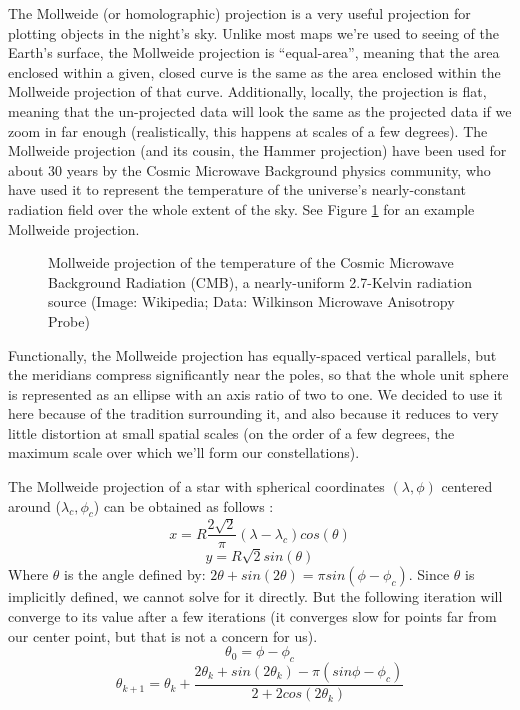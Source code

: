\documentclass[paper=a4, fontsize=11pt]{scrartcl} %
\begin{document}
The Mollweide (or homolographic) projection is a very useful projection for plotting objects in the night’s sky. Unlike most maps we’re used to seeing of the Earth’s surface, the Mollweide projection is ``equal-area”, meaning that the area enclosed within a given, closed curve is the same as the area enclosed within the Mollweide projection of that curve. Additionally, locally, the projection is flat, meaning that the un-projected data will look the same as the projected data if we zoom in far enough (realistically, this happens at scales of a few degrees). The Mollweide projection (and its cousin, the Hammer projection) have been used for about 30 years by the Cosmic Microwave Background physics community, who have used it to represent the temperature of the universe’s nearly-constant radiation field over the whole extent of the sky.  See Figure \ref{moll} for an example Mollweide projection.

\begin{figure}
\caption{Mollweide projection of the temperature of the Cosmic Microwave Background Radiation (CMB), a nearly-uniform 2.7-Kelvin radiation source (Image: Wikipedia; Data: Wilkinson Microwave Anisotropy Probe)}
\label{moll}
\end{figure}


Functionally, the Mollweide projection has equally-spaced vertical parallels, but the meridians compress significantly near the poles, so that the whole unit sphere is represented as an ellipse with an axis ratio of two to one. We decided to use it here because of the tradition surrounding it, and also because it reduces to very little distortion at small spatial scales (on the order of a few degrees, the maximum scale over which we’ll form our constellations).

The Mollweide projection of a star with spherical coordinates $(\lambda,\phi)$ centered around ($\lambda_c,\phi_c$) can be obtained as follows \cite{Snyder1987}:
$$
x = R\frac{2\sqrt{2}}{\pi}(\lambda-\lambda_c)cos(\theta)$$$$
y = R\sqrt{2}sin(\theta)
$$
Where $\theta$ is the angle defined by: $2\theta + sin(2\theta)=\pi sin(\phi-\phi_c)$.  Since $\theta$ is implicitly defined, we cannot solve for it directly. But the following iteration will converge to its value after a few iterations (it converges slow for points far from our center point, but that is not a concern for us).
$$
\theta_0 = \phi-\phi_c
$$$$
\theta_{k+1} = \theta_k + \frac{2\theta_k+sin(2\theta_k)-\pi(sin\phi-\phi_c)}{2+2cos(2\theta_k)}
$$
\end{document}
